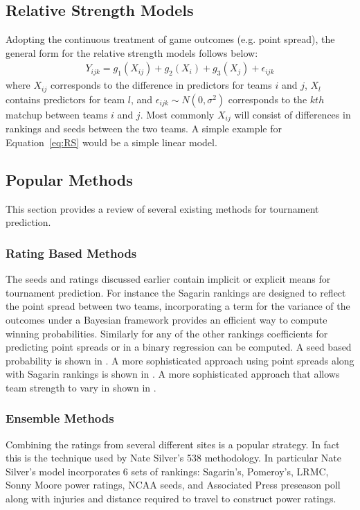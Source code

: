 \subsection{Relative Strength Models}
Adopting the continuous treatment of game outcomes (e.g. point spread), the general form for the relative strength models follows below:
\begin{eqnarray}
Y_{ijk} = g_1(X_{ij}) + g_2(X_i) + g_3(X_j) +  \epsilon_{ijk}
\label{eq:RS}
\end{eqnarray}
where $X_{ij}$ corresponds to the difference in predictors for teams $i$ and $j$, $X_l$ contains predictors for team $l$, and $\epsilon_{ijk} \sim N(0,\sigma^2)$ corresponds to the $kth$ matchup between teams $i$ and $j$.  Most commonly $X_{ij}$ will consist of differences in rankings and seeds between the two teams.  A simple example for Equation~\ref{eq:RS} would be a simple linear model.

\subsection{Popular Methods}  This section provides a review of several existing methods for tournament prediction.
\subsubsection{Rating Based Methods} 
The seeds and ratings discussed earlier contain implicit or explicit means for tournament prediction.  For instance the Sagarin rankings are designed to reflect the point spread between two teams, incorporating a term for the variance of the outcomes under a Bayesian framework provides an efficient way to compute winning probabilities.  Similarly for any of the other rankings coefficients for predicting point spreads or in a binary regression can be computed. A seed based probability is shown in \cite{schwertman1996}.  A more sophisticated approach using point spreads along with Sagarin rankings is shown in \cite{carlin1996}.  A more sophisticated approach that allows team strength to vary in shown in \cite{glickman1998}.
\subsubsection{Ensemble Methods}
Combining the ratings from several different sites is a popular strategy.  In fact this is the technique used by Nate Silver's 538 methodology.  In particular Nate Silver's model incorporates 6 sets of rankings: Sagarin's, Pomeroy's, LRMC, Sonny Moore power ratings, NCAA seeds, and Associated Press preseason poll along with injuries and distance required to travel to construct power ratings.  

